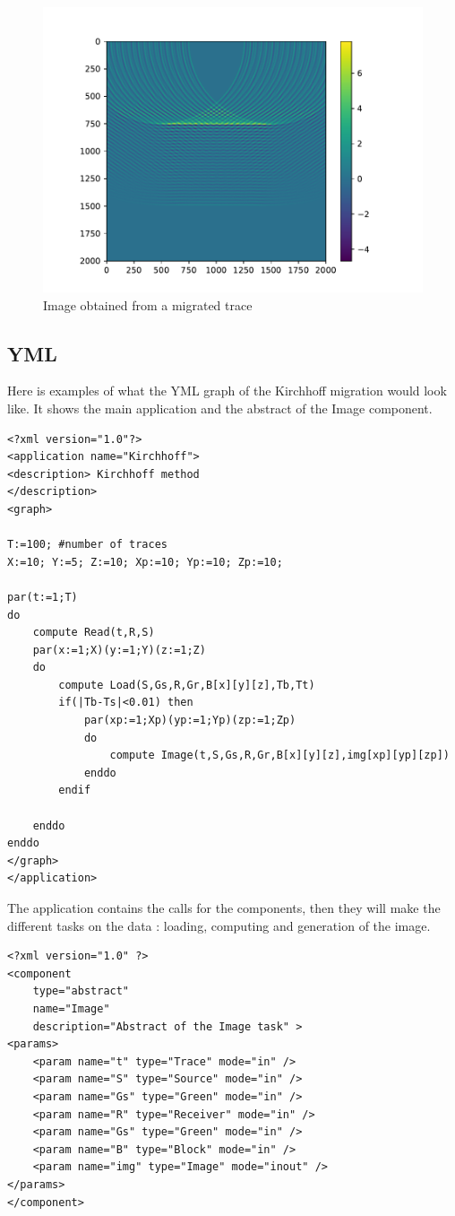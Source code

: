 \begin{figure}[H]
	\centering
	\includegraphics{img.pdf}
	\caption{Image obtained from a migrated trace\label{fig:kirchhoff_image}}
\end{figure}

\subsection{YML}
Here is examples of what the YML graph of the Kirchhoff migration would look like.
It shows the main application and the abstract of the Image component.

\begin{lstlisting}[tabsize=3, frame=single, basicstyle=\small\ttfamily, title=YML application]
<?xml version="1.0"?>
<application name="Kirchhoff">
<description> Kirchhoff method
</description>
<graph>

T:=100; #number of traces
X:=10; Y:=5; Z:=10; Xp:=10; Yp:=10; Zp:=10;

par(t:=1;T)
do
	compute Read(t,R,S)
	par(x:=1;X)(y:=1;Y)(z:=1;Z)
	do
		compute Load(S,Gs,R,Gr,B[x][y][z],Tb,Tt)
		if(|Tb-Ts|<0.01) then
			par(xp:=1;Xp)(yp:=1;Yp)(zp:=1;Zp)
			do
				compute Image(t,S,Gs,R,Gr,B[x][y][z],img[xp][yp][zp])
			enddo
		endif

	enddo
enddo
</graph>
</application>
\end{lstlisting}

The application contains the calls for the components, then they will make the different tasks on the data : loading, computing and generation of the image.

\begin{lstlisting}[tabsize=5, frame=single, basicstyle=\small\ttfamily, title=Abstract of Image task]
<?xml version="1.0" ?>
<component
	type="abstract"
	name="Image"
	description="Abstract of the Image task" >
<params>
	<param name="t" type="Trace" mode="in" />
	<param name="S" type="Source" mode="in" />
	<param name="Gs" type="Green" mode="in" />
	<param name="R" type="Receiver" mode="in" />
	<param name="Gs" type="Green" mode="in" />
	<param name="B" type="Block" mode="in" />
	<param name="img" type="Image" mode="inout" />
</params>
</component>
\end{lstlisting}

